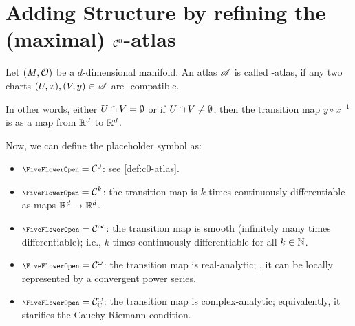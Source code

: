 
\section{Adding Structure by refining the (maximal) \texorpdfstring{\(\mathcal C^0\)}{C0}-atlas}

\begin{definition}
	Let \((M, \mathcal{O})\) be a \(d\)-dimensional manifold. An atlas \(\mathscr{A}\) is called {\scalebox{0.75}\FiveFlowerOpen}-atlas, if any two charts \((U, x), (V, y) \in \mathscr{A}\) are {\scalebox{0.75}\FiveFlowerOpen}-compatible.
\end{definition}

In other words, either \(U \cap V = \emptyset\) or if \(U \cap V \neq \emptyset\), then the transition map \(y \circ x^{-1}\) is {\scalebox{0.75}\FiveFlowerOpen} as a map from \(\mathbb R^d\) to \(\mathbb R^d\).
\begin{figure}[H]
	\centering
\end{figure}

Now, we can define the placeholder symbol {\scalebox{0.75}\FiveFlowerOpen} as:
\begin{itemize}
	\item \({\scalebox{0.75}\FiveFlowerOpen} = \SC^0\): see \cref{def:c0-atlas}.
	\item \({\scalebox{0.75}\FiveFlowerOpen} = \SC^k\): the transition map is \(k\)-times continuously differentiable as maps \(\mathbb R^d \to \mathbb R^d\).
	\item \({\scalebox{0.75}\FiveFlowerOpen} = \SC^{\infty}\): the transition map is smooth (infinitely many times differentiable); i.e., \(k\)-times continuously differentiable for all \(k \in \mathbb N\).
	\item \({\scalebox{0.75}\FiveFlowerOpen} = \SC^{\omega}\): the transition map is real-analytic; \ie, it can be locally represented by a convergent power series.
	\item \({\scalebox{0.75}\FiveFlowerOpen} = \SC^{\omega}_{\C}\): the transition map is complex-analytic; equivalently, it starifies the Cauchy-Riemann condition.
\end{itemize}

